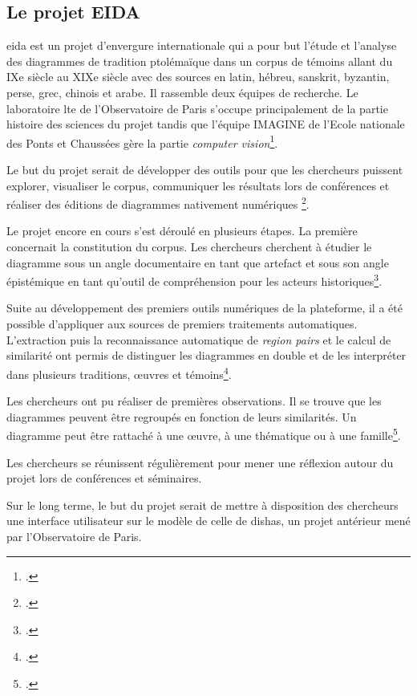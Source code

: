 \subsection{Le projet EIDA}

\gls{eida} est un projet d'envergure internationale qui a pour but l'étude et l'analyse des diagrammes de tradition ptolémaïque dans un corpus de témoins allant du IXe siècle au XIXe siècle avec des sources en latin, hébreu, sanskrit, byzantin, perse, grec, chinois et arabe. Il rassemble deux équipes de recherche. Le laboratoire \gls{lte} de l'Observatoire de Paris s'occupe principalement de la partie histoire des sciences du projet tandis que l'équipe IMAGINE de l'Ecole nationale des Ponts et Chaussées gère la partie \textit{computer vision}\footcite{albouyAIKONComputerVision}. 

Le but du projet serait de développer des outils pour que les chercheurs puissent explorer, visualiser le corpus, communiquer les résultats lors de conférences et réaliser des éditions de diagrammes nativement numériques \footcite{Conference2023EIDA2023}.

Le projet encore en cours s'est déroulé en plusieurs étapes. La première concernait la constitution du corpus. Les chercheurs cherchent à étudier le diagramme sous un angle documentaire en tant que artefact et sous son angle épistémique en tant qu'outil de compréhension pour les acteurs historiques\footcite{Conference2023EIDA2023}.

Suite au développement des premiers outils numériques de la plateforme, il a été possible d'appliquer aux sources de premiers traitements automatiques. L'extraction puis la reconnaissance automatique de \textit{region pairs} et le calcul de similarité ont permis de distinguer les diagrammes en double et de les interpréter dans plusieurs traditions, œuvres et témoins\footcite{Conference2024Graphic2024}.

Les chercheurs ont pu réaliser de premières observations. Il se trouve que les diagrammes peuvent être regroupés en fonction de leurs similarités. Un diagramme peut être rattaché à une œuvre, à une thématique ou à une famille\footcite{Conference2025Long2025}. 

Les chercheurs se réunissent régulièrement pour mener une réflexion autour du projet lors de conférences et séminaires. 
 

Sur le long terme, le but du projet serait de mettre à disposition des chercheurs une interface utilisateur sur le modèle de celle de \gls{dishas}, un projet antérieur mené par l'Observatoire de Paris. \\





 
